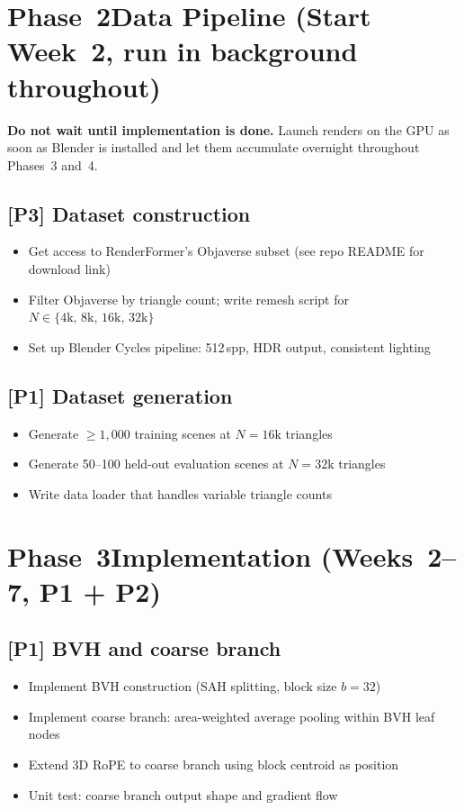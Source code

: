\documentclass[11pt,a4paper]{article}
\newcommand{\role}[1]{\textbf{[#1]}}
\newcommand{\critical}[1]{\textcolor{warn}{\textbf{#1}}}
\newcommand{\sq}{\item[$\square$]}
\begin{document}
\section{Phase~2\quad Data Pipeline \textnormal{(Start Week~2, run in background throughout)}}

\critical{Do not wait until implementation is done.} Launch renders on the GPU as soon as
Blender is installed and let them accumulate overnight throughout Phases~3 and~4.

\subsection{\role{P3} Dataset construction}
\begin{itemize}[leftmargin=1.8em, itemsep=2pt]
  \sq Get access to RenderFormer's Objaverse subset (see repo README for download link)
  \sq Filter Objaverse by triangle count; write remesh script for
      $N \in \{4\text{k},\,8\text{k},\,16\text{k},\,32\text{k}\}$
  \sq Set up Blender Cycles pipeline: 512\,spp, HDR output, consistent lighting
\end{itemize}

\subsection{\role{P1} Dataset generation}
\begin{itemize}[leftmargin=1.8em, itemsep=2pt]
  \sq Generate $\geq\!1{,}000$ training scenes at $N = 16\text{k}$ triangles
  \sq Generate 50--100 held-out evaluation scenes at $N = 32\text{k}$ triangles
  \sq Write data loader that handles variable triangle counts
\end{itemize}

\section{Phase~3\quad Implementation \textnormal{(Weeks~2--7, P1 + P2)}}

\subsection{\role{P1} BVH and coarse branch}
\begin{itemize}[leftmargin=1.8em, itemsep=2pt]
  \sq Implement BVH construction (SAH splitting, block size $b = 32$)
  \sq Implement coarse branch: area-weighted average pooling within BVH leaf nodes
  \sq Extend 3D RoPE to coarse branch using block centroid as position
  \sq Unit test: coarse branch output shape and gradient flow
\end{itemize}
\end{document}
